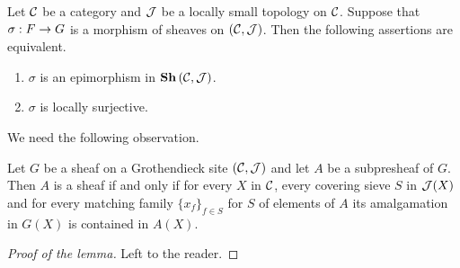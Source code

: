 \begin{theorem}\label{theorem:epimorphismsinthecategoryofsheaves}
Let ${\mathcal C}$ be a category and ${\mathcal J}$ be a locally small topology on ${\mathcal C}$. Suppose that $\sigma:F\rightarrow G$ is a morphism of sheaves on $\left({\mathcal C},{\mathcal J}\right)$. Then the following assertions are equivalent.
\begin{enumerate}[label=\emph{\textbf{(\roman*)}}, leftmargin=1.5em]
\item $\sigma$ is an epimorphism in $\mathbf{Sh}\left({\mathcal C},{\mathcal J}\right)$.
\item $\sigma$ is locally surjective.
\end{enumerate}
\end{theorem}
\noindent
We need the following observation.

\begin{lemma}\label{lemma:sheafcriterionforsubpresheaves}
Let $G$ be a sheaf on a Grothendieck site $({\mathcal C},{\mathcal J})$ and let $A$ be a subpresheaf of $G$. Then $A$ is a sheaf if and only if for every $X$ in ${\mathcal C}$, every covering sieve $S$ in ${\mathcal J}(X)$ and for every matching family $\{x_f\}_{f\in S}$ for $S$ of elements of $A$ its amalgamation in $G(X)$ is contained in $A(X)$.
\end{lemma}
\begin{proof}[Proof of the lemma]
Left to the reader.
\end{proof}

